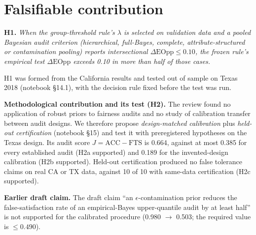 \documentclass[10pt]{article}
\begin{document}
\section{Falsifiable contribution}
\textbf{H1.} \emph{When the group-threshold rule's $\lambda$ is selected on validation data and a pooled Bayesian audit
criterion (hierarchical, full-Bayes, complete, attribute-structured or contamination pooling) reports intersectional
$\Delta\text{EOpp}\le0.10$, the frozen rule's empirical test $\Delta\text{EOpp}$ exceeds 0.10 in more than half of those cases.}

H1 was formed from the California results and tested out of sample on Texas 2018 (notebook \S14.1), with the decision
rule fixed before the test was run.


\noindent\textbf{Methodological contribution and its test (H2).} The review found no application of robust priors to
fairness audits and no study of calibration transfer between audit designs. We therefore propose \emph{design-matched
calibration} plus \emph{held-out certification} (notebook \S15) and test it with preregistered hypotheses on the Texas
design. Its audit score $J=\text{ACC}-\text{FTS}$ is 0.664, against at most 0.385 for every established audit (H2a
supported) and 0.189 for the invented-design calibration (H2b supported). Held-out certification produced no false
tolerance claims on real CA or TX data, against 10 of 10 with same-data certification (H2c supported).

\noindent\textbf{Earlier draft claim.} The draft claim ``an $\epsilon$-contamination prior reduces the false-satisfaction
rate of an empirical-Bayes upper-quantile audit by at least half'' is not supported for the calibrated procedure
(0.980 $\to$ 0.503; the required value is $\le0.490$).


\end{document}
